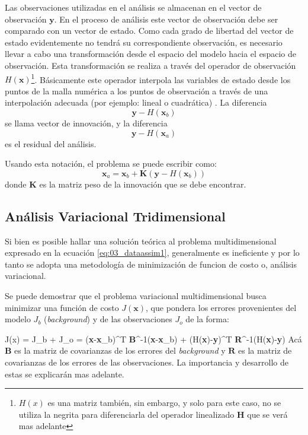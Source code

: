 Las observaciones utilizadas en el análisis se almacenan en el vector de observación $\mathbf{y}$. En el proceso de análisis este vector de observación debe ser comparado con un vector de estado. Como cada grado de libertad del vector de estado evidentemente no tendrá su correspondiente observación, es necesario llevar a cabo una transformación desde el espacio del modelo hacia el espacio de observación. Esta transformación se realiza a través del operador de observación $H(\mathbf{x})$\footnote{$H(x)$ es una matriz también, sin embargo, y solo para este caso, no se utiliza la negrita para diferenciarla del operador linealizado $\textbf{H}$ que se verá mas adelante}. Básicamente este operador interpola las variables de estado desde los puntos de la malla numérica a los puntos de observación a través de una interpolación adecuada (por ejemplo: lineal o cuadrática) . La diferencia
\begin{equation*}
	\mathbf{y}-H(\mathbf{x}_b)
\end{equation*}
se llama vector de innovación, y la diferencia
\begin{equation*}
\mathbf{y}-H(\mathbf{x}_a)
\end{equation*}
es el residual del análisis.

Usando esta notación, el problema se puede escribir como:
\begin{equation}\label{eq:03_dataassim1}
	\mathbf{x}_a = \mathbf{x}_b + \mathbf{K}(\mathbf{y} - H(\mathbf{x}_b))
\end{equation}
donde $\mathbf{K}$ es la matriz peso de la innovación que se debe encontrar.
\subsection{Análisis Variacional Tridimensional}

Si bien es posible hallar una solución teórica al problema multidimensional expresado en la ecuación \ref{eq:03_dataassim1}, generalmente es ineficiente y por lo tanto se adopta una metodología de minimización de funcion de costo o, análisis variacional.

Se puede demostrar \cite{warner2010numerical} que el problema variacional multidimensional busca minimizar una función de costo $J(\mathbf{x})$, que pondera los errores provenientes del modelo $J_b$ (\emph{background}) y de las observaciones $J_o$ de la forma:

\be 
J(x) = J_b + J_o = (\textbf{x}-\textbf{x}_b)^T \textbf{B}^{-1}(\textbf{x}-\textbf{x}_b) + (H(\textbf{x})-\textbf{y})^T \textbf{R}^{-1}(H(\textbf{x})-\textbf{y})
\ee 
Acá $\textbf{B}$ es la matriz de covarianzas de los errores del \emph{background} y $\textbf{R}$ es la matriz de covarianzas de los errores de las observaciones. La importancia y desarrollo de estas se explicarán mas adelante.

